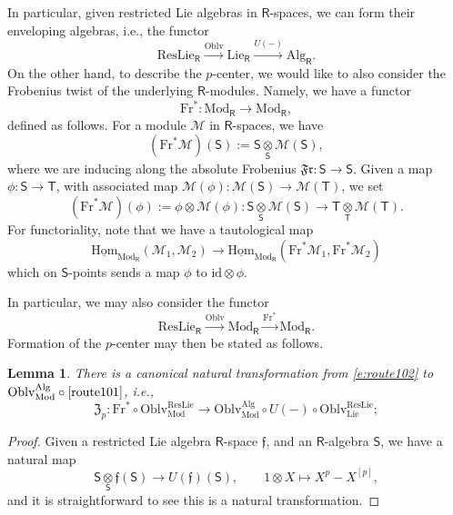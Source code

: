 \documentclass{amsart}
\newtheorem{Lem}[Thm]{Lemma}
\theoremstyle{definition}
\newcommand{\uHom}{\underline{\on{Hom}}}
\newcommand{\sss}{\subsubsection{}}
\newcommand{\Sing}{\mathsf{S}}
\newcommand{\Ting}{\mathsf{T}}
\newcommand{\sM}{\mathscr{M}}
\newcommand{\on}{\mathrm}
\newcommand{\Ring}{\mathsf{R}}
\newcommand{\ff}{\mathfrak{f}}
\newcommand{\fZ}{\mathfrak{Z}}
\numberwithin{equation}{section}
\begin{document}
\sss In particular, given restricted Lie algebras in $\Ring$-spaces, we can form their enveloping algebras, i.e., the functor
\begin{equation} \label{route101}\on{ResLie}_\Ring \xrightarrow{\on{Oblv}} \on{Lie}_\Ring \xrightarrow{U(-)} \on{Alg}_\Ring.\end{equation}
On the other hand, to describe the $p$-center, we would like to also consider the Frobenius twist of the underlying $\Ring$-modules. Namely, we have a functor 
$$\on{Fr}^*: \on{Mod}_\Ring \rightarrow \on{Mod}_\Ring,$$ defined as follows. For a module $\sM$ in $\Ring$-spaces, we have 
$$(\on{Fr}^*\sM)(\Sing) := \Sing \underset{\Sing}\otimes \sM(\Sing),$$where we are inducing along the absolute Frobenius $\mathfrak{Fr}: \Sing \rightarrow \Sing$. Given a map $\phi: \Sing \rightarrow \Ting$, with associated map $\sM(\phi): \sM(\Sing) \rightarrow \sM(\Ting)$, we set $$(\on{Fr}^* \sM)(\phi) := \phi \otimes \sM(\phi): \Sing \underset{\Sing} \otimes \sM(\Sing) \rightarrow \Ting \underset{\Ting} \otimes \sM(\Ting).$$ 
For functoriality, note that we have a tautological map 
$$\uHom_{\on{Mod}_\Ring}(\sM_1, \sM_2) \rightarrow \uHom_{\on{Mod}_\Ring}(\on{Fr}^* \sM_1, \on{Fr}^* \sM_2)$$
which on $\Sing$-points sends a map $\phi$ to $\on{id} \otimes \phi$. 


In particular, we may also consider the functor
\begin{equation} \label{e:route102} \on{ResLie}_\Ring \xrightarrow{\on{Oblv}} \on{Mod}_\Ring  \xrightarrow{\on{Fr}^*} \on{Mod}_\Ring .\end{equation}
Formation of the $p$-center may then be stated as follows. 
\begin{Lem} There is a canonical natural transformation from \eqref{e:route102} to $\on{Oblv}^{\on{Alg}}_{\on{Mod}} \circ \eqref{route101}$, i.e., 
$$\fZ_p: \on{Fr}^* \circ \on{Oblv}^{\on{ResLie}}_{\on{Mod}} \rightarrow \on{Oblv}^{\on{Alg}}_{\on{Mod}} \circ U(-) \circ \on{Oblv}^{\on{ResLie}}_{\on{Lie}};$$
\end{Lem}

\begin{proof} Given a restricted Lie algebra $\Ring$-space $\ff$, and an $\Ring$-algebra $\Sing$, we have a natural map 
\begin{equation} \label{e:pcent}\Sing \underset{\Sing}\otimes \ff(\Sing) \rightarrow U(\ff)(\Sing), \quad \quad 1 \otimes X \mapsto X^p - X^{[p]},\end{equation}
and it is straightforward to see this is a natural transformation.
\end{proof}
\end{document}
